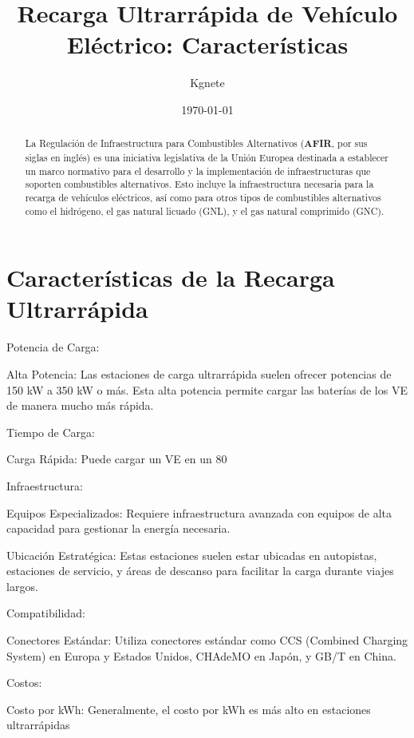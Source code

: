 \documentclass{article}
\title{Recarga Ultrarrápida de Vehículo Eléctrico: Características }
\author{Kgnete}
\date{\today}
\begin{document}
\maketitle

\begin{abstract}


La Regulación de Infraestructura para Combustibles Alternativos (\textbf{AFIR}, por sus siglas en inglés) es una iniciativa legislativa de la Unión Europea destinada a establecer un marco normativo para el desarrollo y la implementación de infraestructuras que soporten combustibles alternativos. Esto incluye la infraestructura necesaria para la recarga de vehículos eléctricos, así como para otros tipos de combustibles alternativos como el hidrógeno, el gas natural licuado (GNL), y el gas natural comprimido (GNC).
\end{abstract}

\section{Características de la Recarga Ultrarrápida}

Potencia de Carga:

Alta Potencia: Las estaciones de carga ultrarrápida suelen ofrecer potencias de 150 kW a 350 kW o más. Esta alta potencia permite cargar las baterías de los VE de manera mucho más rápida.

Tiempo de Carga:

Carga Rápida: Puede cargar un VE en un 80%

Infraestructura:

Equipos Especializados: Requiere infraestructura avanzada con equipos de alta capacidad para gestionar la energía necesaria.

Ubicación Estratégica: Estas estaciones suelen estar ubicadas en autopistas, estaciones de servicio, y áreas de descanso para facilitar la carga durante viajes largos.

Compatibilidad:

Conectores Estándar: Utiliza conectores estándar como CCS (Combined Charging System) en Europa y Estados Unidos, CHAdeMO en Japón, y GB/T en China.

Costos:

Costo por kWh: Generalmente, el costo por kWh es más alto en estaciones ultrarrápidas
\end{document}
